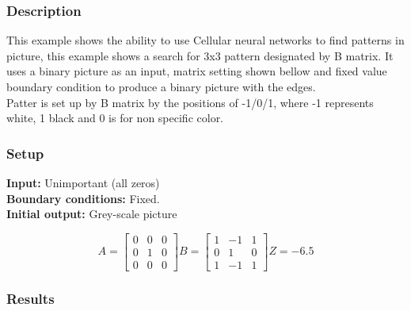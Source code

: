 \subsubsection{Description}
This example shows the ability to use Cellular neural networks to find patterns in picture, this example shows a search for 3x3  pattern designated by B matrix. It uses a binary picture as an input, matrix setting shown bellow and fixed value boundary condition to produce a binary picture with the edges.
\\ Patter is set up by B matrix by the positions of -1/0/1, where -1 represents white, 1 black and 0 is for non specific color. 
\subsubsection{Setup}

\textbf{Input:} Unimportant (all zeros)\\
\textbf{Boundary conditions:} Fixed.\\
\textbf{Initial output:} Grey-scale picture

\begin{minipage}{0.9\linewidth}
\begin{equation}
A =
\begin{bmatrix}
 0 &  0 &  0 \\
  0 &  1 &  0 \\
  0 &  0 &  0
\end{bmatrix}
B =
\begin{bmatrix}
 1 & -1 & 1 \\
 0 & 1 & 0 \\
 1 & -1 & 1
\end{bmatrix}
Z = -6.5
\end{equation}
\end{minipage}
\subsubsection{Results}


